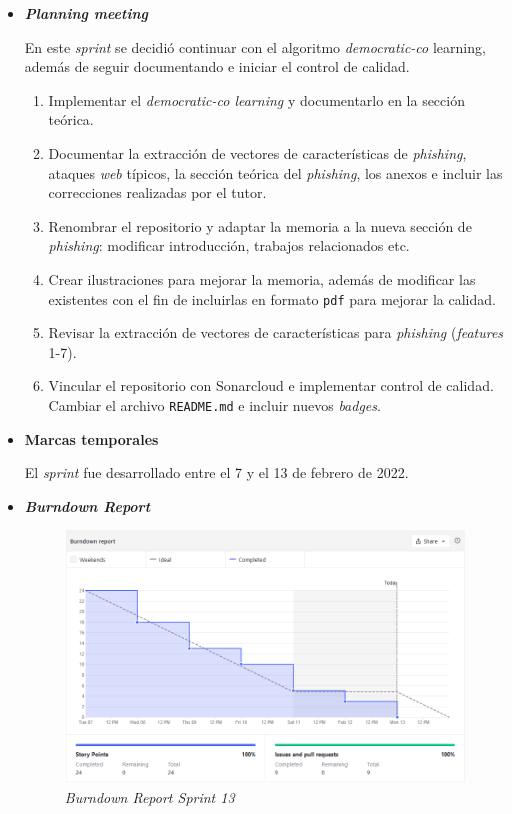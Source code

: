\begin{itemize}
	\item \textbf{\textit{Planning meeting}}
	
	En este \textit{sprint} se decidió continuar con el algoritmo \textit{democratic-co} learning, además de seguir documentando e iniciar el control de calidad.
	
	\begin{enumerate}
		\item Implementar el \textit{democratic-co learning} y documentarlo en la sección teórica.
		\item Documentar la extracción de vectores de características de \textit{phishing}, ataques \textit{web} típicos, la sección teórica del \textit{phishing}, los anexos e incluir las correcciones realizadas por el tutor.
		\item Renombrar el repositorio y adaptar la memoria a la nueva sección de \textit{phishing}: modificar introducción, trabajos relacionados etc.
		\item Crear ilustraciones para mejorar la memoria, además de modificar las existentes con el fin de incluirlas en formato \texttt{pdf} para mejorar la calidad.
		\item Revisar la extracción de vectores de características para \textit{phishing} (\textit{features} 1-7).
		\item Vincular el repositorio con Sonarcloud e implementar control de calidad. Cambiar el archivo \texttt{README.md} e incluir nuevos \textit{badges}.
	\end{enumerate}
	\item \textbf{Marcas temporales}		
	
	El \textit{sprint} fue desarrollado entre el 7 y el 13 de febrero de 2022.
	
	\item \textbf{\textit{Burndown Report}}
	
	\begin{figure}[h]
		\caption{\textit{Burndown Report Sprint 13}}
		\centering
		\includegraphics[width=\textwidth]{../img/anexos/bdr/s13_bdr}
	\end{figure}


\end{itemize}
